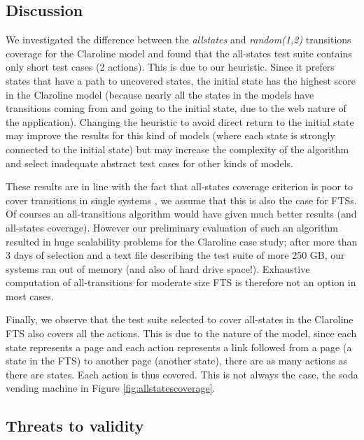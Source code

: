 \subsection{Discussion}

We investigated the difference between the \textit{allstates} and \textit{random(1,2)} transitions coverage for the Claroline model  and found that the all-states test suite contains only short test cases (2 actions). 
This is due to our heuristic. Since it prefers states that have a path to uncovered states, the initial state has the highest score in the Claroline model (because nearly all the states in the models have transitions coming from and going to the initial state, due to the web nature of the application). Changing the heuristic to avoid direct return to the initial state may improve the results for this kind of models (where each state is strongly connected to the initial state) but may increase the complexity of the algorithm and select inadequate abstract test cases for other kinds of models. 

These results are in line with the fact that all-states coverage criterion is poor to cover transitions in single systems \cite{Utting2007}, we assume that this is also the case for FTSs. Of courses an all-transitions algorithm would have given much better results (and all-states coverage). However our preliminary evaluation of such an algorithm resulted in huge scalability problems for the Claroline case study; after more than 3 days of selection and a text file describing the test suite of more 250 GB, our systems ran out  of memory (and also of hard drive space!).  Exhaustive computation of all-transitions for moderate size FTS is therefore not an option in most cases.    

Finally, we observe that the test suite selected to cover all-states in the Claroline FTS also covers all the actions. This is due to the nature of the model, since each state represents a page and each action represents a link followed from a page (\ie a state in the FTS) to another page (\ie another state), there are as many actions as there are states. Each action is thus covered. This is not always the case, \eg the soda vending machine in Figure \ref{fig:allstatescoverage}.

\subsection{Threats to validity}


